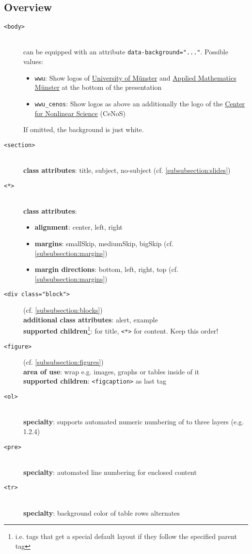 \documentclass{scrartcl}
\newcommand{\code}[1]{{\tt #1}}
\newcommand{\tag}[1]{\code{<#1>}}
\begin{document}
\begin{appendix}
\subsection{Overview}

\begin{description}
\item[\tag{body}] ~\\
  can be equipped with an attribute \code{data-background="..."}. Possible values:
  \begin{itemize}
  \item \code{wwu}: Show logos of \href{http://www.uni-muenster.de}{University of Münster} and \href{http://wwwmath.uni-muenster.de/42/en/institute/computational-and-applied-mathematics/}{Applied Mathematics Münster} at the bottom of the presentation
  \item \code{wwu\_cenos}: Show logos as above an additionally the logo of the \href{http://www.uni-muenster.de/CeNoS/en/index.html}{Center for Nonlinear Science} (CeNoS)
  \end{itemize}
  If omitted, the background is just white.
\item[\tag{section}]~\\
  {\bf class attributes}: title, subject, no-subject (cf. \ref{subsubsection:slides})
\item[\tag{*}]~\\
  {\bf class attributes}:
  \begin{itemize}
  \item {\bf alignment}: center, left, right
  \item {\bf margins}: smallSkip, mediumSkip, bigSkip (cf. \ref{subsubsection:margins})
  \item {\bf margin directions}: bottom, left, right, top (cf. \ref{subsubsection:margins})
  \end{itemize}
\item[\tag{div class="block"}] (cf. \ref{subsubsection:blocks}) \\
  {\bf additional class attributes}: alert, example\\
  {\bf supported children}\footnote{i.e. tags that get a special default layout if they follow the specified parent tag}: \tag{h1} for title, \tag{*} for content. Keep this order!
\item[\tag{figure}] (cf. \ref{subsubsection:figures}) \\
  {\bf area of use}: wrap e.g. images, graphs or tables inside of it\\
  {\bf supported children}: \tag{figcaption} as last tag
\item[\tag{ol}] ~\\
  {\bf specialty}: supports automated numeric numbering of to three layers (e.g. 1.2.4)
\item[\tag{pre}] ~\\
  {\bf specialty}: automated line numbering for enclosed content
\item[\tag{tr}] ~\\
  {\bf specialty}: background color of table rows alternates

\end{description}


\end{appendix}
\end{document}
